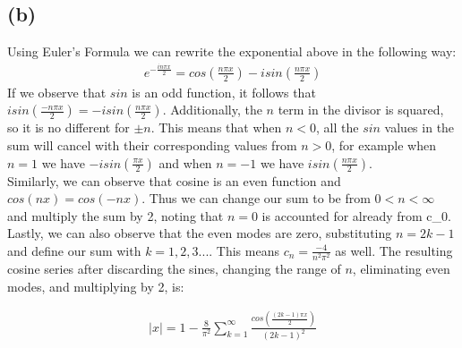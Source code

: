 \documentclass{article}
\begin{document}
\subsection*{\textbf{(b)}}
Using Euler's Formula we can rewrite the exponential above in the following way:
\begin{equation}
\begin{aligned}
e^{-\frac{in\pi x}{2}} = cos(\frac{n\pi x}{2}) - isin(\frac{n\pi x}{2})
\end{aligned}
\end{equation}
If we observe that $sin$ is an odd function, it follows that $isin(\frac{-n\pi x}{2}) = - isin(\frac{n\pi x}{2})$. Additionally, the $n$ term in the divisor is squared, so it is no different for $\pm n$. This means that when $n<0$, all the $sin$ values in the sum will cancel with their corresponding values from $n>0$, for example when $n=1$ we have  $- isin(\frac{\pi x}{2})$ and when $n=-1$ we have   $isin(\frac{n\pi x}{2})$.\\
Similarly, we can observe that cosine is an even function and $cos(nx) = cos(-nx)$. Thus we can change our sum to be from $0< n < \infty$ and multiply the sum by 2, noting that $n=0$ is accounted for already from c_0.
\\
Lastly, we can also observe that the even modes are zero, substituting $n = 2k-1$ and define our sum with $k = 1, 2, 3...$. This means $c_n = \frac{-4}{n^2\pi^2}$ as well. The resulting cosine series after discarding the sines, changing the range of $n$, eliminating even modes, and multiplying by 2, is:
\begin{tcolorbox}[minipage,colback=white,arc=0pt,outer arc=0pt]
\begin{equation}
\begin{aligned}
|x| = 1 - \frac{8}{\pi^2}\sum_{k=1}^{\infty}\frac{cos(\frac{(2k-1)\pi x}{2})}{(2k-1)^2}
\end{aligned}
\end{equation}
\end{tcolorbox}
\end{document}

